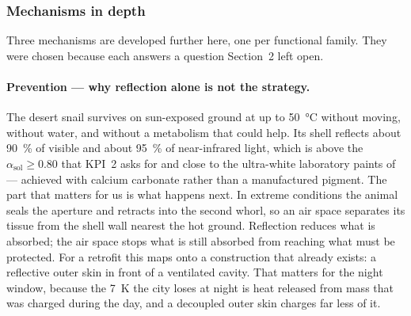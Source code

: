 
\subsubsection{Mechanisms in depth}

Three mechanisms are developed further here, one per functional family. They
were chosen because each answers a question Section~2 left open.

\paragraph{Prevention --- why reflection alone is not the strategy.} The desert
snail survives on sun-exposed ground at up to \qty{50}{\celsius} without moving,
without water, and without a metabolism that could help. Its shell reflects
about \qty{90}{\percent} of visible and about \qty{95}{\percent} of near-infrared
light, which is above the $\alpha_\mathrm{sol}\geq0.80$ that KPI~2 asks for and
close to the ultra-white laboratory paints of \textcite{li2021} --- achieved with
calcium carbonate rather than a manufactured pigment. The part that matters for
us is what happens next. In extreme conditions the animal seals the aperture and
retracts into the second whorl, so an air space separates its tissue from the
shell wall nearest the hot ground. Reflection reduces what is absorbed; the air
space stops what is still absorbed from reaching what must be protected. For a
retrofit this maps onto a construction that already exists: a reflective outer
skin in front of a ventilated cavity. That matters for the night window, because
the \qty{7}{\kelvin} the city loses at night is heat released from mass that was
charged during the day, and a decoupled outer skin charges far less of it.

